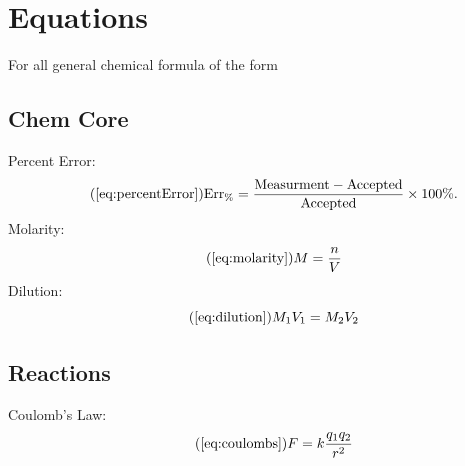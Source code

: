 \section{Equations}
    For all general chemical formula of the form 
    \subsection{Chem Core}
        Percent Error:
        \begin{equation}\tag{\ref{eq:percentError}}
            \text{Err}_\%=\frac{\text{Measurment}-\text{Accepted}}{\text{Accepted}}\times 100\%.
        \end{equation}
        Molarity:
        \begin{equation}\tag{\ref{eq:molarity}}
            M = \frac{n}{V}
        \end{equation}
        Dilution:
        \begin{equation}\tag{\ref{eq:dilution}}
            M_1V_1 = M_2V_2
        \end{equation}
    \subsection{Reactions}
        Coulomb's Law:
        \begin{equation}\tag{\ref{eq:coulombs}}
             F = k \frac{q_1 q_2}{r^2}
        \end{equation}
